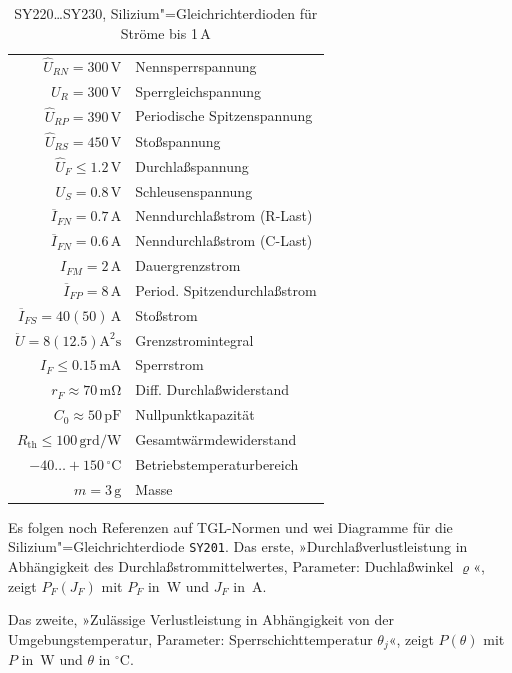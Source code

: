 \documentclass[a4paper,10pt,fleqn,twocolumn,twoside]{scrartcl}
\numberwithin{equation}{section}
\begin{document}
\begin{table}[t]
\begin{tabular}{rl}
\toprule
$\hat U_{RN} = 300\,\mathrm{V}$ & Nennsperrspannung\\
$U_R = 300\,\mathrm{V}$ & Sperrgleichspannung\\
$\hat U_{RP} = 390\,\mathrm{V}$ & Periodische Spitzenspannung\\
$\hat U_{RS} = 450\,\mathrm{V}$ & Stoßspannung\\
\midrule
$\hat U_F \le 1.2\,\mathrm{V}$ & Durchlaßspannung\\
$U_S = 0.8\,\mathrm{V}$ & Schleusenspannung\\
$\overline I_{FN} = 0.7\,\mathrm{A}$
  & Nenndurchlaßstrom (R-Last)\\
$\overline I_{FN} = 0.6\,\mathrm{A}$
  & Nenndurchlaßstrom (C-Last)\\
\midrule
$I_{FM} = 2\,\mathrm{A}$ & Dauergrenzstrom\\
$\overline I_{FP}=8\,\mathrm{A}$
  & Period. Spitzendurchlaßstrom\\
$\overline I_{FS}=40(50)\,\mathrm{A}$
  & Stoßstrom\\
$\ddot U = 8(12.5)\mathrm{A^2 s}$
  & Grenzstromintegral\\
\midrule
$I_F \le 0.15\,\mathrm{mA}$ & Sperrstrom\\
$r_F \approx 70\,\mathrm{m\Omega}$
  & Diff. Durchlaßwiderstand\\
$C_0 \approx 50\,\mathrm{pF}$
  & Nullpunktkapazität\\
$R_{\mathrm{th}}{\le}100\,\mathrm{grd/W}$
  & Gesamtwärmdewiderstand\\
\midrule
$-40{\ldots}{+}150\,\mathrm{{}^\circ C}$
  & Betriebstemperaturbereich\\
$m=3\,\mathrm{g}$ & Masse\\
\bottomrule
\end{tabular}
\caption{SY220{\ldots}SY230, Silizium"=Gleichrichterdioden
für Ströme bis 1\,A}
\label{table:SY}
\end{table}
Es folgen noch Referenzen auf TGL-Normen und
wei Diagramme für die Silizium"=Gleichrichterdiode \texttt{SY201}.
Das erste, »Durchlaßverlustleistung in Abhängigkeit des
Durchlaßstrommittelwertes, Parameter: Duchlaßwinkel
$\varrho$«, zeigt  $P_F(J_F)$ mit $P_F$ in~W und $J_F$ in~A.

Das zweite, »Zulässige Verlustleistung
in Abhängigkeit von der Umgebungstemperatur, Parameter:
Sperrschichttemperatur $\theta_j$«, zeigt $P(\theta)$
mit $P$ in~W und $\theta$ in ${}^\circ\mathrm{C}$.
\end{document}
